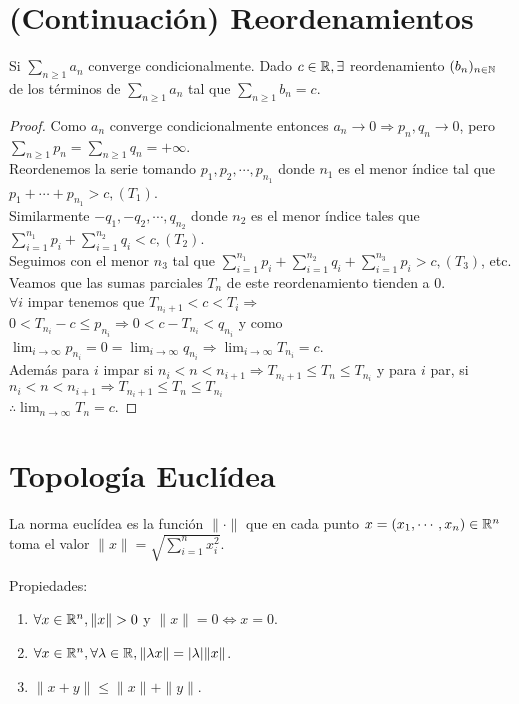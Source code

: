 \section{(Continuación) Reordenamientos}

\begin{theorem}
  Si $\sum_{n \geq 1} a_n$ converge condicionalmente. Dado $c \in \mathbb{R}, \exists$ reordenamiento $(b_n)_{n \in \mathbb{N}}$ de los términos de $\sum_{n \geq 1} a_n$ tal que $\sum_{n \geq 1} b_n = c$.
  \begin{proof}
    Como $a_n$ converge condicionalmente entonces $a_n \to 0 \Rightarrow p_n, q_n \to 0$, pero $\sum_{n \geq 1} p_n = \sum_{n \geq 1} q_n = +\infty$. \\
    Reordenemos la serie tomando $p_1, p_2, \cdots, p_{n_1}$ donde $n_1$ es el menor índice tal que $p_1 + \cdots + p_{n_1} > c, (T_1)$. \\
    Similarmente $-q_1, -q_2, \cdots, q_{n_2}$ donde $n_2$ es el menor índice tales que $\sum_{i = 1}^{n_1} p_i + \sum_{i = 1}^{n_2} q_i < c, (T_2)$. \\
    Seguimos con el menor $n_3$ tal que $\sum_{i = 1}^{n_1} p_i + \sum_{i = 1}^{n_2} q_i + \sum_{i = 1}^{n_3} p_i > c, (T_3)$, etc. \\
    Veamos que las sumas parciales $T_n$ de este reordenamiento tienden a 0. \\
    $\forall i$ impar tenemos que $T_{n_i +1} < c < T_i \Rightarrow$ \\
    $0 < T_{n_i} - c \leq p_{n_i} \Rightarrow 0 < c - T_{n_i} < q_{n_i}$ y como $\lim_{i \to \infty} p_{n_i} = 0 = \lim_{i \to \infty} q_{n_i} \Rightarrow \lim_{i \to \infty} T_{n_i} = c$. \\
    Además para $i$ impar si $n_i < n < n_{i+1} \Rightarrow T_{n_i+1} \leq T_n \leq T_{n_i}$ y para $i$ par, si $n_i < n < n_{i+1} \Rightarrow T_{n_i+1} \leq T_n \leq T_{n_i}$ \\
    $\therefore \lim_{n \to \infty} T_n = c$.
  \end{proof}
\end{theorem}

\section{Topología Euclídea}

\begin{definition}
  La norma euclídea es la función $\| \cdot \|$ que en cada punto $x = (x_1, \cdots, x_n) \in \mathbb{R}^n$ toma el valor $\|x\| = \sqrt{\sum_{i = 1}^n x_i^2}$.

  Propiedades: \\
  \begin{enumerate}
    \item $\forall x \in \mathbb{R}^n, \|x\| > 0$ y $\|x\| = 0 \iff x = 0$.
    \item $\forall x \in \mathbb{R}^n, \forall \lambda \in \mathbb{R}, \| \lambda x\| = |\lambda| \|x\|$.
    \item $\|x+y\| \leq \|x\| + \|y\|$.
  \end{enumerate}
\end{definition}

